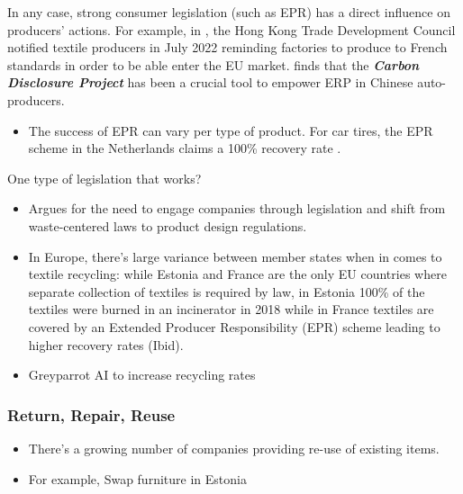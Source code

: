 \documentclass[
  letterpaper,
  DIV=11,
  numbers=noendperiod]{scrartcl}
\providecommand{\tightlist}{%
  \setlength{\itemsep}{0pt}\setlength{\parskip}{0pt}}\usepackage{longtable,booktabs,array}
\begin{document}
In any case, strong consumer legislation (such as EPR) has a direct
influence on producers' actions. For example, in
\citet{hktdcresearchFranceExpandsProducer2022}, the Hong Kong Trade
Development Council notified textile producers in July 2022 reminding
factories to produce to French standards in order to be able enter the
EU market. \citet{pengExtendedProducerResponsibility2023} finds that the
\textbf{\emph{Carbon Disclosure Project}} has been a crucial tool to
empower ERP in Chinese auto-producers.

\begin{itemize}
\tightlist
\item
  The success of EPR can vary per type of product. For car tires, the
  EPR scheme in the Netherlands claims a 100\% recovery rate
  \citet{campbell-johnstonHowCircularYour2020}.
\end{itemize}

One type of legislation that works?

\begin{itemize}
\item
  \citet{steenmansFosteringCircularEconomy2023} Argues for the need to
  engage companies through legislation and shift from waste-centered
  laws to product design regulations.
\item
  In Europe, there's large variance between member states when in comes
  to textile recycling: while Estonia and France are the only EU
  countries where separate collection of textiles is required by law, in
  Estonia 100\% of the textiles were burned in an incinerator in 2018
  while in France textiles are covered by an Extended Producer
  Responsibility (EPR) scheme leading to higher recovery rates (Ibid).
\item
  Greyparrot AI to increase recycling rates
  \citet{natashalomasUKAIStartup2024}
\end{itemize}

\subsubsection{Return, Repair, Reuse}\label{return-repair-reuse}

\begin{itemize}
\tightlist
\item
  There's a growing number of companies providing re-use of existing
  items.
\item
  \citet{SmartSwap} For example, Swap furniture in Estonia
\end{itemize}
\end{document}
